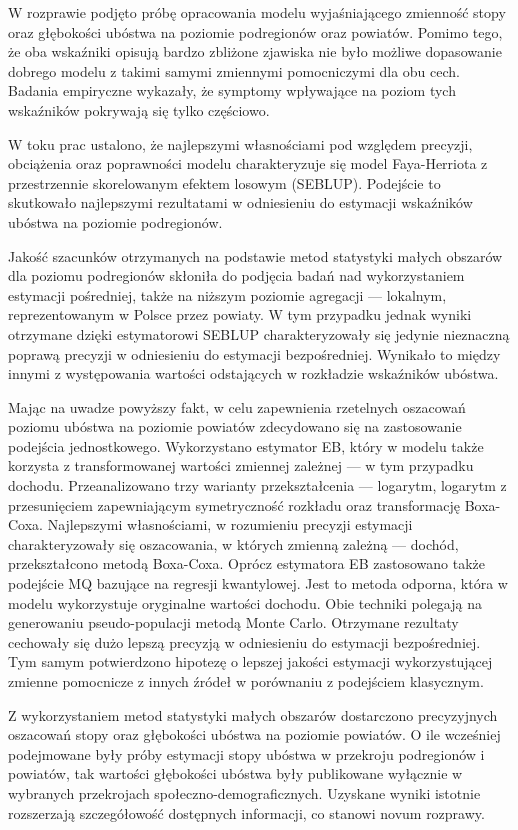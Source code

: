 W rozprawie podjęto próbę opracowania modelu wyjaśniającego zmienność stopy oraz głębokości ubóstwa na poziomie podregionów oraz powiatów. Pomimo tego, że oba wskaźniki opisują bardzo zbliżone zjawiska nie było możliwe dopasowanie dobrego modelu z takimi samymi zmiennymi pomocniczymi dla obu cech. Badania empiryczne wykazały, że symptomy wpływające na poziom tych wskaźników pokrywają się tylko częściowo. 

W toku prac ustalono, że najlepszymi własnościami pod względem precyzji, obciążenia oraz poprawności modelu charakteryzuje się model Faya-Herriota z przestrzennie skorelowanym efektem losowym (SEBLUP). Podejście to skutkowało najlepszymi rezultatami w odniesieniu do estymacji wskaźników ubóstwa na poziomie podregionów.

Jakość szacunków otrzymanych na podstawie metod statystyki małych obszarów dla poziomu podregionów skłoniła do podjęcia badań nad wykorzystaniem estymacji pośredniej, także na niższym poziomie agregacji --– lokalnym, reprezentowanym w Polsce przez powiaty. W tym przypadku jednak wyniki otrzymane dzięki estymatorowi SEBLUP charakteryzowały się jedynie nieznaczną poprawą precyzji w odniesieniu do estymacji bezpośredniej. Wynikało to między innymi z występowania wartości odstających w rozkładzie wskaźników ubóstwa.

Mając na uwadze powyższy fakt, w celu zapewnienia rzetelnych oszacowań poziomu ubóstwa na poziomie powiatów zdecydowano się na zastosowanie podejścia jednostkowego. Wykorzystano estymator EB, który w modelu także korzysta z transformowanej wartości zmiennej zależnej --- w tym przypadku dochodu. Przeanalizowano trzy warianty przekształcenia --- logarytm, logarytm z przesunięciem zapewniającym symetryczność rozkładu oraz transformację Boxa-Coxa. Najlepszymi własnościami, w rozumieniu precyzji estymacji charakteryzowały się oszacowania, w których zmienną zależną --- dochód, przekształcono metodą Boxa-Coxa. Oprócz estymatora EB zastosowano także podejście MQ bazujące na regresji kwantylowej. Jest to metoda odporna, która w modelu wykorzystuje oryginalne wartości dochodu. Obie techniki polegają na generowaniu pseudo-populacji metodą Monte Carlo. Otrzymane rezultaty cechowały się dużo lepszą precyzją w odniesieniu do estymacji bezpośredniej. Tym samym potwierdzono hipotezę o lepszej jakości estymacji wykorzystującej zmienne pomocnicze z innych źródeł w porównaniu z podejściem klasycznym.

Z wykorzystaniem metod statystyki małych obszarów dostarczono precyzyjnych oszacowań stopy oraz głębokości ubóstwa na poziomie powiatów. O ile wcześniej podejmowane były próby estymacji stopy ubóstwa w przekroju podregionów i powiatów, tak wartości głębokości ubóstwa były publikowane wyłącznie w wybranych przekrojach społeczno-demograficznych. Uzyskane wyniki istotnie rozszerzają szczegółowość dostępnych informacji, co stanowi novum rozprawy.

